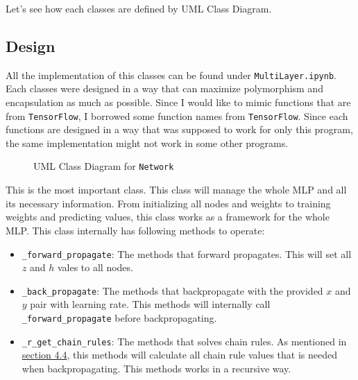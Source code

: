 \documentclass{homework}
\begin{document}
Let's see how each classes are defined by UML Class Diagram.

\subsection{Design}
All the implementation of this classes can be found under \texttt{MultiLayer.ipynb}. Each classes were designed in a way that can maximize polymorphism and encapsulation as much as possible. Since I would like to mimic functions that are from \texttt{TensorFlow}, I borrowed some function names from \texttt{TensorFlow}. Since each functions are designed in a way that was supposed to work for only this program, the same implementation might not work in some other programs.

\begin{figure}[h]
\centering
    \caption{UML Class Diagram for \texttt{Network}}
\end{figure}

This is the most important class. This class will manage the whole MLP and all its necessary information. From initializing all nodes and weights to training weights and predicting values, this class works as a framework for the whole MLP. This class internally has following methods to operate:

\begin{itemize}
    \item \texttt{_forward_propagate}: The methods that forward propagates. This will set all $z$ and $h$ vales to all nodes.
    \item \texttt{_back_propagate}: The methods that backpropagate with the provided $x$ and $y$ pair with learning rate. This methods will internally call \texttt{_forward_propagate} before backpropagating. 
    \item \texttt{_r_get_chain_rules}: The methods that solves chain rules. As mentioned in \hyperref[rules]{section 4.4}, this methods will calculate all chain rule values that is needed when backpropagating. This methods works in a recursive way.
\end{itemize}
\end{document}
